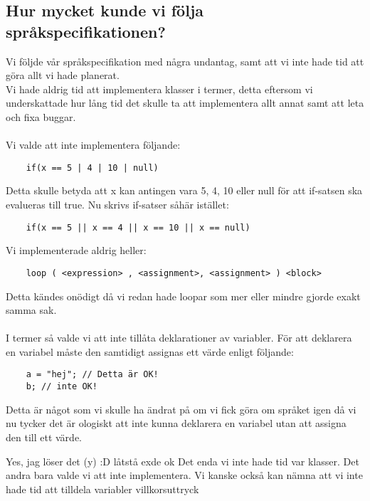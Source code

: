 \documentclass{TDP003mall}
\begin{document}
\subsection{Hur mycket kunde vi följa språkspecifikationen?}
Vi följde vår språkspecifikation med några undantag, samt att vi inte hade tid att göra allt vi hade planerat.\\
Vi hade aldrig tid att implementera klasser i termer, detta eftersom vi underskattade hur lång tid det skulle ta att implementera allt annat samt att leta och fixa buggar.\\\\
Vi valde att inte implementera följande:
\begin{lstlisting}
    if(x == 5 | 4 | 10 | null)  
\end{lstlisting}
Detta skulle betyda att x kan antingen vara 5, 4, 10 eller null för att if-satsen ska evalueras till true. Nu skrivs if-satser såhär istället:\\
\begin{lstlisting}
    if(x == 5 || x == 4 || x == 10 || x == null)
\end{lstlisting}
Vi implementerade aldrig heller:
\begin{lstlisting}
    loop ( <expression> , <assignment>, <assignment> ) <block>
\end{lstlisting}
Detta kändes onödigt då vi redan hade loopar som mer eller mindre gjorde exakt samma sak.\\
\\
I termer så valde vi att inte tillåta deklarationer av variabler. För att deklarera en variabel måste den samtidigt assignas ett värde enligt följande:
\begin{lstlisting}
    a = "hej"; // Detta är OK!
    b; // inte OK!
\end{lstlisting}
Detta är något som vi skulle ha ändrat på om vi fick göra om språket igen då vi nu tycker det är ologiskt att inte kunna deklarera en variabel utan att assigna den till ett värde.

Yes, jag löser det (y) :D
låtstå exde
ok
Det enda vi inte hade tid var klasser. Det andra bara valde vi att inte implementera. Vi kanske också kan nämna att vi inte hade tid att tilldela variabler villkorsuttryck
\end{document}
